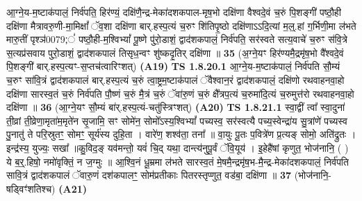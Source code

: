 \documentclass[17pt]{extarticle}
\begin{document}
                  आ॒ग्ने॒य-म॒ष्टाक॑पालं॒ निर्व॑पति॒ हिर॑ण्यं॒ दक्षि॑णै॒न्द्र-मेका॑दशकपाल-मृष॒भो दक्षि॑णा वैश्वदे॒वं च॒रुं पि॒शङ्गी॑ पष्ठौ॒ही दक्षि॑णा मैत्रावरु॒णी-मा॒मिक्षां᳚ ॅव॒शा दक्षि॑णा बार्.हस्प॒त्यं च॒रुꣳ शि॑तिपृ॒ष्ठो दक्षि॑णाऽऽदि॒त्यां म॒ल्॒.हां ग॒र्भिणी॒मा ल॑भते मारु॒तीं पृश्ञ॑0079;ं॑ पष्ठौ॒ही-म॒श्विभ्यां᳚ पू॒ष्णे पु॑रो॒डाशं॒ द्वाद॑शकपालं॒ निर्व॑पति॒ सर॑स्वते सत्य॒वाचे॑ च॒रुꣳ स॑वि॒त्रे स॒त्यप्र॑सवाय पुरो॒डाशं॒ द्वाद॑शकपालं तिसृध॒न्वꣳ शु॑ष्कदृ॒तिर् दक्षि॑णा ॥ \textbf{  35} \newline
                  \newline
                      (अ॒ग्ने॒यꣳ हिर॑ण्यमै॒द्रमृ॑ष॒भो वै᳚श्वदे॒वं पि॒शङ्गी॑ बार्.हस्प॒त्यꣳ-स॒प्तच॑त्वारिꣳशत्)  \textbf{(A19)} \newline \newline
                                        \textbf{ TS 1.8.20.1} \newline
                  आ॒ग्ने॒य-म॒ष्टाक॑पालं॒ निर्व॑पति सौ॒म्यं च॒रुꣳ सा॑वि॒त्रं द्वाद॑शकपालं बार्.हस्प॒त्यं च॒रुं त्वा॒ष्ट्रम॒ष्टाक॑पालं ॅवैश्वान॒रं द्वाद॑शकपालं॒ दक्षि॑णो रथवाहनवा॒हो दक्षि॑णा सारस्व॒तं च॒रुं निर्व॑पति पौ॒ष्णं च॒रुं मै॒त्रं च॒रुं ॅवा॑रु॒णं च॒रुं क्षै᳚त्रप॒त्यं च॒रुमा॑दि॒त्यं च॒रुमुत्त॑रो रथवाहनवा॒हो दक्षि॑णा ॥ \textbf{  36} \newline
                  \newline
                      (आ॒ग्ने॒यꣳ सौ॒म्यं बा॑र्.हस्प॒त्यं-चतु॑स्त्रिꣳशत्)  \textbf{(A20)} \newline \newline
                                        \textbf{ TS 1.8.21.1} \newline
                  स्वा॒द्वीं त्वा᳚ स्वा॒दुना॑ ती॒व्रां ती॒व्रेणा॒मृता॑म॒मृते॑न सृ॒जामि॒ सꣳ सोमे॑न॒ सोमो᳚ऽस्य॒श्विभ्यां᳚ पच्यस्व॒ सर॑स्वत्यै पच्य॒स्वेन्द्रा॑य सु॒त्रांणे॑ पच्यस्व पु॒नातु॑ ते परि॒स्रुतꣳ॒॒ सोमꣳ॒॒ सूर्य॑स्य दुहि॒ता । वारे॑ण॒ शश्व॑ता॒ तना᳚ ॥ वा॒युः पू॒तः प॒वित्रे॑ण प्र॒त्यङ् सोमो॒ अति॑द्रुतः । इन्द्र॑स्य॒ युज्यः॒ सखा᳚ ॥कु॒विद॒ङ् यव॑मन्तो॒ यवं॑ चि॒द् यथा॒  दान्त्य॑नुपू॒र्वं ॅवि॒यूय॑ । इ॒हेहै॑षां कृणुत॒ भोज॑नानि॒ ( ) ये ब॒र्॒.हिषो॒ नमो॑वृक्तिं॒ न ज॒ग्मुः ॥ आ॒श्वि॒नं धू॒म्रमा ल॑भते सारस्व॒तं मे॒षमै॒न्द्रमृ॑ष॒भ-मै॒न्द्र-मेका॑दशकपालं॒ निर्व॑पति सावि॒त्रं द्वाद॑शकपालं ॅवारु॒णं दश॑कपालꣳ॒॒ सोम॑प्रतीकाः पितरस्तृप्णुत॒ वड॑बा॒ दक्षि॑णा ॥ \textbf{  37 } \newline
                  \newline
                      (भोज॑नानि॒-षड्विꣳ॑शतिश्च)  \textbf{(A21)} \newline \newline
\end{document}
